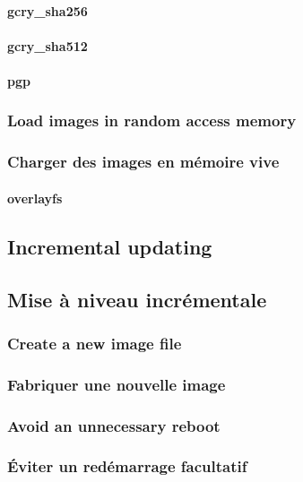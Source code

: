 \paragraph{gcry\_sha256}

\paragraph{gcry\_sha512}

\paragraph{pgp}

\ml
{\subsubsection{Load images in random access memory}}
{\subsubsection{Charger des images en mémoire vive}}

\paragraph{overlayfs}

\ml
{\subsection{Incremental updating}}
{\subsection{Mise à niveau incrémentale}}

\ml
{\subsubsection{Create a new image file}}
{\subsubsection{Fabriquer une nouvelle image}}

\ml
{\subsubsection{Avoid an unnecessary reboot}}
{\subsubsection{Éviter un redémarrage facultatif}}

